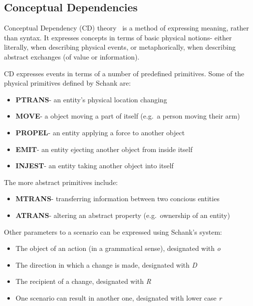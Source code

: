 \documentclass[dissertation.tex]{subfiles}
\begin{document}
    \subsection{Conceptual Dependencies}

    Conceptual Dependency (CD) theory~\cite{SCHANK1972552} is a method of expressing meaning, rather than syntax. It expresses concepts in terms of basic physical notions- either literally, when describing physical events, or metaphorically, when describing abstract exchanges (of value or information). 

    CD expresses events in terms of a number of predefined primitives. Some of the physical primitives defined by Schank are:
    \begin{itemize}
        \item \textbf{PTRANS}- an entity's physical location changing
        \item \textbf{MOVE}- a object moving a part of itself (e.g.~a person moving their arm)
        \item \textbf{PROPEL}- an entity applying a force to another object
        \item \textbf{EMIT}- an entity ejecting another object from inside itself
        \item \textbf{INJEST}- an entity taking another object into itself
    \end{itemize}

    The more abstract primitives include:
    \begin{itemize}
        \item \textbf{MTRANS}- transferring information between two concious entities
        \item \textbf{ATRANS}- altering an abstract property (e.g.~ownership of an entity)
    \end{itemize}

    Other parameters to a scenario can be expressed using Schank's system:
    \begin{itemize}
        \item The object of an action (in a grammatical sense), designated with \emph{o}
        \item The direction in which a change is made, designated with \emph{D}
        \item The recipient of a change, designated with \emph{R}
        \item One scenario can result in another one, designated with lower case \emph{r}
    \end{itemize}
\end{document}
